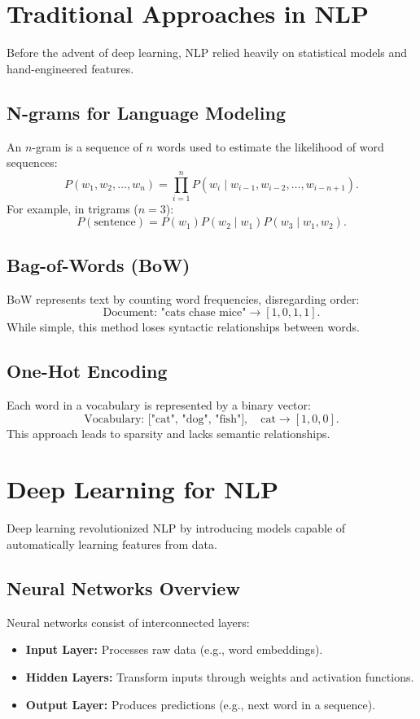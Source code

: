 \section{Traditional Approaches in NLP}
Before the advent of deep learning, NLP relied heavily on statistical models and hand-engineered features.

\subsection{N-grams for Language Modeling}
An \(n\)-gram is a sequence of \(n\) words used to estimate the likelihood of word sequences:
\[
P(w_1, w_2, \ldots, w_n) = \prod_{i=1}^{n} P(w_i \mid w_{i-1}, w_{i-2}, \ldots, w_{i-n+1}).
\]
For example, in trigrams (\(n=3\)):
\[
P(\text{sentence}) = P(w_1) P(w_2 \mid w_1) P(w_3 \mid w_1, w_2).
\]

\subsection{Bag-of-Words (BoW)}
BoW represents text by counting word frequencies, disregarding order:
\[
\text{Document: "cats chase mice"} \to [1, 0, 1, 1].
\]
While simple, this method loses syntactic relationships between words.

\subsection{One-Hot Encoding}
Each word in a vocabulary is represented by a binary vector:
\[
\text{Vocabulary: ["cat", "dog", "fish"]}, \quad \text{cat} \to [1, 0, 0].
\]
This approach leads to sparsity and lacks semantic relationships.

\section{Deep Learning for NLP}
Deep learning revolutionized NLP by introducing models capable of automatically learning features from data.

\subsection{Neural Networks Overview}
Neural networks consist of interconnected layers:
\begin{itemize}
    \item \textbf{Input Layer:} Processes raw data (e.g., word embeddings).
    \item \textbf{Hidden Layers:} Transform inputs through weights and activation functions.
    \item \textbf{Output Layer:} Produces predictions (e.g., next word in a sequence).
\end{itemize}

